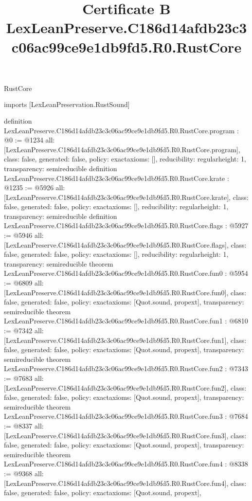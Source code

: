\begin{lexlean}{RustCore}
\title{Certificate B LexLeanPreserve.C186d14afdb23c3c06ac99ce9e1db9fd5.R0.RustCore}
\begin{coremodule}
imports [LexLeanPreservation.RustSound]

definition LexLeanPreserve.C186d14afdb23c3c06ac99ce9e1db9fd5.R0.RustCore.program : @0 := @1234 {
  all: [LexLeanPreserve.C186d14afdb23c3c06ac99ce9e1db9fd5.R0.RustCore.program],
  class: false,
  generated: false,
  policy: exact{axioms: []},
  reducibility: regular{height: 1},
  transparency: semireducible
}
definition LexLeanPreserve.C186d14afdb23c3c06ac99ce9e1db9fd5.R0.RustCore.krate : @1235 := @5926 {
  all: [LexLeanPreserve.C186d14afdb23c3c06ac99ce9e1db9fd5.R0.RustCore.krate],
  class: false,
  generated: false,
  policy: exact{axioms: []},
  reducibility: regular{height: 1},
  transparency: semireducible
}
definition LexLeanPreserve.C186d14afdb23c3c06ac99ce9e1db9fd5.R0.RustCore.flags : @5927 := @5946 {
  all: [LexLeanPreserve.C186d14afdb23c3c06ac99ce9e1db9fd5.R0.RustCore.flags],
  class: false,
  generated: false,
  policy: exact{axioms: []},
  reducibility: regular{height: 1},
  transparency: semireducible
}
theorem LexLeanPreserve.C186d14afdb23c3c06ac99ce9e1db9fd5.R0.RustCore.fun0 : @5954 := @6809 {
  all: [LexLeanPreserve.C186d14afdb23c3c06ac99ce9e1db9fd5.R0.RustCore.fun0],
  class: false,
  generated: false,
  policy: exact{axioms: [Quot.sound, propext]},
  transparency: semireducible
}
theorem LexLeanPreserve.C186d14afdb23c3c06ac99ce9e1db9fd5.R0.RustCore.fun1 : @6810 := @7342 {
  all: [LexLeanPreserve.C186d14afdb23c3c06ac99ce9e1db9fd5.R0.RustCore.fun1],
  class: false,
  generated: false,
  policy: exact{axioms: [Quot.sound, propext]},
  transparency: semireducible
}
theorem LexLeanPreserve.C186d14afdb23c3c06ac99ce9e1db9fd5.R0.RustCore.fun2 : @7343 := @7683 {
  all: [LexLeanPreserve.C186d14afdb23c3c06ac99ce9e1db9fd5.R0.RustCore.fun2],
  class: false,
  generated: false,
  policy: exact{axioms: [Quot.sound, propext]},
  transparency: semireducible
}
theorem LexLeanPreserve.C186d14afdb23c3c06ac99ce9e1db9fd5.R0.RustCore.fun3 : @7684 := @8337 {
  all: [LexLeanPreserve.C186d14afdb23c3c06ac99ce9e1db9fd5.R0.RustCore.fun3],
  class: false,
  generated: false,
  policy: exact{axioms: [Quot.sound, propext]},
  transparency: semireducible
}
theorem LexLeanPreserve.C186d14afdb23c3c06ac99ce9e1db9fd5.R0.RustCore.fun4 : @8338 := @9368 {
  all: [LexLeanPreserve.C186d14afdb23c3c06ac99ce9e1db9fd5.R0.RustCore.fun4],
  class: false,
  generated: false,
  policy: exact{axioms: [Quot.sound, propext]},
}
\end{coremodule}
\end{lexlean}
